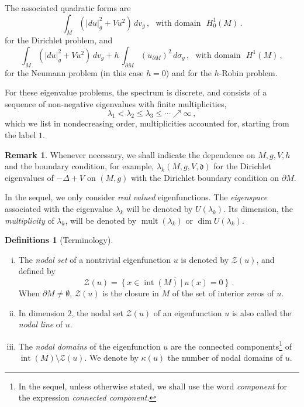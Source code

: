 \documentclass[12pt,a4paper]{amsart}
\theoremstyle{plain} %
\theoremstyle{definition}
\newtheorem{definitions}[theorem]{Definitions}
\newtheorem{remark}[theorem]{Remark}
\numberwithin{equation}{section}
\numberwithin{figure}{section}
\numberwithin{table}{section}
\newcommand{\cZ}{\mathcal{Z}}
\newcommand{\mf}{\mathfrak}
\DeclareMathOperator{\mult}{mult}
\DeclareMathOperator{\inte}{int}
\newcommand{\sm}{\!\setminus\!}
\newcommand{\set}[1]{\left\lbrace #1 \right\rbrace}
\begin{document}
The associated quadratic forms are
%
\begin{equation}\label{E-evp-2dq}
\int_M \left( |du|^2_g + V u^2 \right) \, dv_g\,, \text{~~with domain~~} H_0^1(M)\,.
\end{equation}
%
for the Dirichlet problem, and
%
\begin{equation}\label{E-evp-2rq}
\int_M \left( |du|^2_g + V u^2 \right) \, dv_g + h \, \int_{\partial M} (u_{\partial M})^2\, d\sigma_g\,,\text{~~with domain~~} H^1(M)\,,
\end{equation}
%
for the Neumann problem (in this case $h=0$) and for the $h$-Robin problem.\medskip


For these eigenvalue problems, the spectrum is discrete, and consists of a sequence of non-negative eigenvalues with finite multiplicities,
%
\begin{equation}\label{E-evp-2ev}
\lambda_1 < \lambda_2 \le \lambda_3 \le \cdots \nearrow \infty \,,
\end{equation}
%
which we list in nondecreasing order, multiplicities accounted for, starting from the label $1$.

\begin{remark}\label{R-evp-2}
Whenever necessary, we shall indicate the dependence on $M, g, V, h$ and the boundary condition, for example, $\lambda_k(M,g,V,\mf{d})$ for the Dirichlet eigenvalues of $-\Delta + V$ on $(M,g)$ with the Dirichlet boundary condition on $\partial M$.
\end{remark}%

In the sequel, we only consider \emph{real valued} eigenfunctions. The \emph{eigenspace} associated with the eigenvalue $\lambda_k$ will be denoted by $U(\lambda_k)$. Its dimension, the \emph{multiplicity} of $\lambda_k$, will be denoted by $\mult(\lambda_k)$ or $\dim U(\lambda_k)$.\medskip


\begin{definitions}[Terminology]\label{D-evp2-00}\phantom{}
\begin{enumerate}[(i)]
\item The \emph{nodal set} of a nontrivial eigenfunction $u$ is denoted by $\cZ(u)$, and defined by
%
\begin{equation}\label{E-evp-ns}
\cZ(u) = \overline{\set{x \in \inte(M) ~|~ u(x) = 0}}\,.
\end{equation}
%
When $\partial M \not = \emptyset$, $\cZ(u)$ is the closure in $M$ of the set of interior zeros of $u$.
\item In dimension $2$, the nodal set $\cZ(u)$ of an eigenfunction $u$ is also called the \emph{nodal line} of $u$.
\item The \emph{nodal domains} of the eigenfunction $u$ are the connected components\footnote{In the sequel, unless otherwise stated, we shall use the word \emph{component} for the expression \emph{connected component}.} of $ \inte(M) \sm \cZ(u)$. We denote by $\kappa(u)$ the number of nodal domains of $u$.
\end{enumerate}
\end{definitions}%
\end{document}

